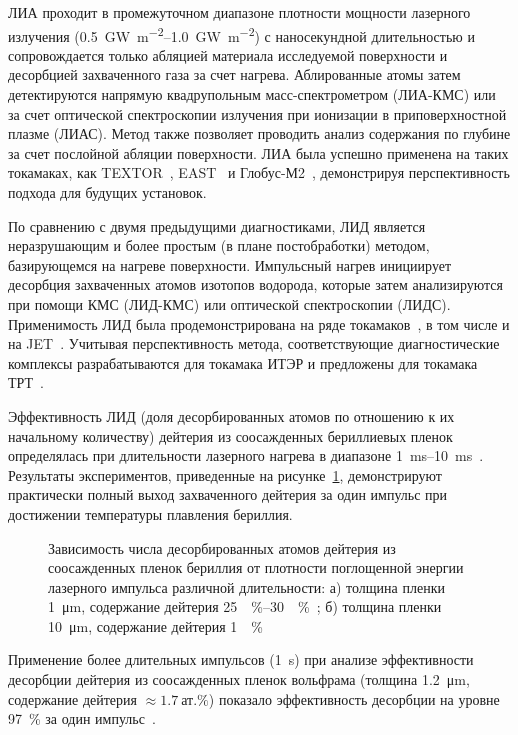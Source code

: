 ЛИА проходит в промежуточном диапазоне плотности мощности лазерного излучения (\SIrange{0.5}{1.0}{\giga\watt\per\meter\squared}) с наносекундной длительностью и сопровождается только абляцией материала исследуемой поверхности и десорбцией захваченного газа за счет нагрева. Аблированные атомы затем детектируются напрямую квадрупольным масс-спектрометром (ЛИА-КМС) или за счет оптической спектроскопии излучения при ионизации в приповерхностной плазме (ЛИАС). Метод также позволяет проводить анализ содержания по глубине за счет послойной абляции поверхности. ЛИА была успешно применена на таких токамаках, как TEXTOR~\cite{Gierse2016}, EAST~\cite{Hu2018} и Глобус-М2~\cite{Medvedev2024}, демонстрируя перспективность подхода для будущих установок. 

По сравнению с двумя предыдущими диагностиками, ЛИД является неразрушающим и более простым (в плане постобработки) методом, базирующемся на нагреве поверхности. Импульсный нагрев инициирует десорбция захваченных атомов изотопов водорода, которые затем анализируются при помощи КМС (ЛИД-КМС) или оптической спектроскопии (ЛИДС). Применимость ЛИД была продемонстрирована на ряде токамаков~\cite{Schweer2009, Medvedev2024}, в том числе и на JET~\cite{Zlobinski2024}. Учитывая перспективность метода, соответствующие диагностические комплексы разрабатываются для токамака ИТЭР и предложены для токамака ТРТ~\cite{Razdobarin2022}. 

Эффективность ЛИД (доля десорбированных атомов по отношению к их начальному количеству) дейтерия из соосажденных бериллиевых пленок определялась при длительности лазерного нагрева в диапазоне \SIrange{1}{10}{\milli\second}~\cite{Zlobinski2019, Zlobinski2020}. Результаты экспериментов, приведенные на рисунке~\cref{fig:ch1/LID_efficiency}, демонстрируют практически полный выход захваченного дейтерия за один импульс при достижении температуры плавления бериллия. 
\begin{figure}[ht]
    \caption{Зависимость числа десорбированных атомов дейтерия из соосажденных пленок бериллия от плотности поглощенной энергии лазерного импульса различной длительности: а) толщина пленки \SI{1}{\micro\meter}, содержание дейтерия \SIrange{25}{30}{\percent}~\cite{Zlobinski2019}; б) толщина пленки \SI{10}{\micro\meter}, содержание дейтерия \SI{1}{\percent}~\cite{Zlobinski2020}}\label{fig:ch1/LID_efficiency}
\end{figure}
Применение более длительных импульсов (\SI{1}{\second}) при анализе эффективности десорбции дейтерия из соосажденных пленок вольфрама (толщина \SI{1.2}{\micro\meter}, содержание дейтерия \( \approx \SI{1.7}{\text{ат.}\percent} \)) показало эффективность десорбции на уровне \SI{97}{\percent} за один импульс~\cite{Yu2019}.

